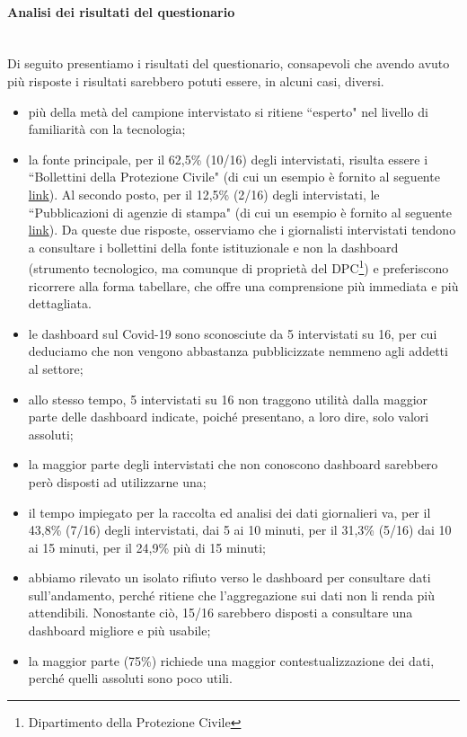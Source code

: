 \paragraph{Analisi dei risultati del questionario}\mbox{}\\
Di seguito presentiamo i risultati del questionario, consapevoli che avendo avuto più risposte i risultati sarebbero potuti essere, in alcuni casi, diversi.
\begin{itemize}
    \item più della metà del campione intervistato si ritiene ``esperto" nel livello di familiarità con la tecnologia;
    \item la fonte principale, per il 62,5\% (10/16) degli intervistati, risulta essere i ``Bollettini della Protezione Civile" (di cui un esempio è fornito al seguente \href{https://github.com/pcm-dpc/COVID-19/blob/master/schede-riepilogative/regioni/dpc-covid19-ita-scheda-regioni-latest.pdf}{link}). Al secondo posto, per il 12,5\% (2/16) degli intervistati, le ``Pubblicazioni di agenzie di stampa" (di cui un esempio è fornito al seguente \href{https://www.ansa.it/canale_saluteebenessere/notizie/sanita/2021/01/02/covid-11.831-nuovi-casi-in-24-ore-364-vittime-_96b5a8cb-4922-492b-87ac-9d9c9590cca4.html}{link}).
    Da queste due risposte, osserviamo che i giornalisti intervistati tendono a consultare i bollettini della fonte istituzionale e non la dashboard (strumento tecnologico, ma comunque di proprietà del DPC\footnote{Dipartimento della Protezione Civile}) e preferiscono ricorrere alla forma tabellare, che offre una comprensione più immediata e più dettagliata.
    \item le dashboard sul Covid-19 sono sconosciute da 5 intervistati su 16, per cui deduciamo che non vengono abbastanza pubblicizzate nemmeno agli addetti al settore;
    \item allo stesso tempo, 5 intervistati su 16 non traggono utilità dalla maggior parte delle dashboard indicate, poiché presentano, a loro dire, solo valori assoluti;
    \item la maggior parte degli intervistati che non conoscono dashboard sarebbero però disposti ad utilizzarne una;
    \item il tempo impiegato per la raccolta ed analisi dei dati giornalieri va, per il 43,8\% (7/16) degli intervistati, dai 5 ai 10 minuti, per il 31,3\% (5/16) dai 10 ai 15 minuti, per il 24,9\% più di 15 minuti;
    \item abbiamo rilevato un isolato rifiuto verso le dashboard per consultare dati sull'andamento, perché ritiene che l'aggregazione sui dati non li renda più attendibili. Nonostante ciò, 15/16 sarebbero disposti a consultare una dashboard migliore e più usabile;
    \item la maggior parte (75\%) richiede una maggior contestualizzazione dei dati, perché quelli assoluti sono poco utili.
\end{itemize}

